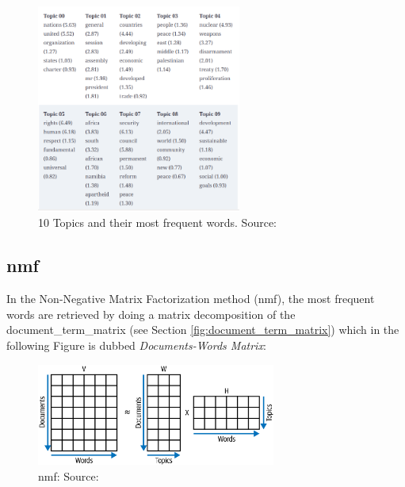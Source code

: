 \begin{figure}[H]   %
    \centering
    \includegraphics[width=0.60\textwidth]{Assets/lda-out}
    \caption{10 Topics and their most frequent words. Source: \cite{blueprints}}
    \label{fig:lda-out}
\end{figure}

\subsection{\gls{nmf}}\label{subsec:nmf}
In the Non-Negative Matrix Factorization method (\gls{nmf}), the most frequent words are retrieved by doing a
matrix decomposition of the \gls{document_term_matrix} (see Section \ref{fig:document_term_matrix}) which in the following Figure is dubbed \emph{Documents-Words Matrix}:

\begin{figure}[H]   %
    \centering
    \includegraphics[width=0.70\textwidth]{Assets/nmf}
    \caption{\gls{nmf}: Source: \cite{blueprints}}
    \label{fig:nmf}
\end{figure}

